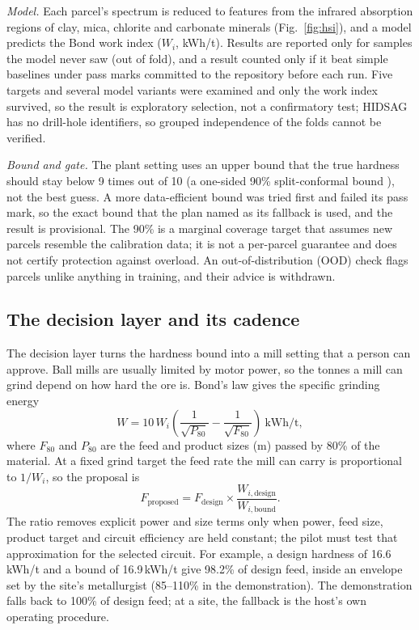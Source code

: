 \documentclass[10pt,a4paper,twocolumn]{article}
\newcommand{\Wi}{$W_i$}
\begin{document}
\emph{Model.} Each parcel's spectrum is reduced to features from the infrared absorption regions of clay, mica, chlorite and carbonate minerals (Fig.~\ref{fig:hsi}), and a model predicts the Bond work index (\Wi{}, kWh/t). Results are reported only for samples the model never saw (out of fold), and a result counted only if it beat simple baselines under pass marks committed to the repository before each run. Five targets and several model variants were examined and only the work index survived, so the result is exploratory selection, not a confirmatory test; HIDSAG has no drill-hole identifiers, so grouped independence of the folds cannot be verified.

\emph{Bound and gate.} The plant setting uses an upper bound that the true hardness should stay below 9 times out of 10 (a one-sided 90\% split-conformal bound \cite{lei2018}), not the best guess. A more data-efficient bound \cite{barber2021} was tried first and failed its pass mark, so the exact bound that the plan named as its fallback is used, and the result is provisional. The 90\% is a marginal coverage target that assumes new parcels resemble the calibration data; it is not a per-parcel guarantee and does not certify protection against overload. An out-of-distribution (OOD) check flags parcels unlike anything in training, and their advice is withdrawn.

\subsection{The decision layer and its cadence}\label{sec:decision}

The decision layer turns the hardness bound into a mill setting that a person can approve. Ball mills are usually limited by motor power, so the tonnes a mill can grind depend on how hard the ore is. Bond's law gives the specific grinding energy \cite{bond1961}
\begin{equation}
W = 10\,W_i\left(\frac{1}{\sqrt{P_{80}}}-\frac{1}{\sqrt{F_{80}}}\right)\ \text{kWh/t},
\end{equation}
where $F_{80}$ and $P_{80}$ are the feed and product sizes (\textmu m) passed by 80\% of the material. At a fixed grind target the feed rate the mill can carry is proportional to $1/W_i$, so the proposal is
\begin{equation}
F_{\text{proposed}} = F_{\text{design}} \times \frac{W_{i,\text{design}}}{W_{i,\text{bound}}}.
\end{equation}
The ratio removes explicit power and size terms only when power, feed size, product target and circuit efficiency are held constant; the pilot must test that approximation for the selected circuit. For example, a design hardness of 16.6\,kWh/t and a bound of 16.9\,kWh/t give 98.2\% of design feed, inside an envelope set by the site's metallurgist (85--110\% in the demonstration). The demonstration falls back to 100\% of design feed; at a site, the fallback is the host's own operating procedure.
\end{document}
